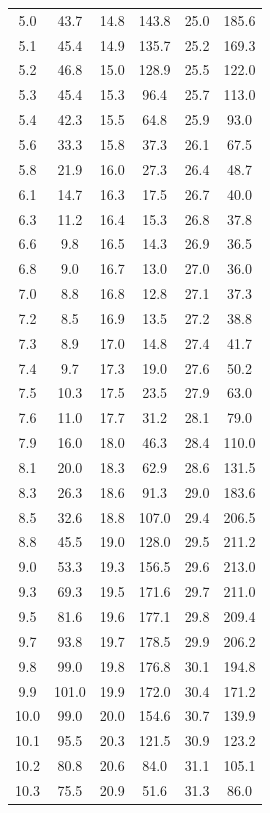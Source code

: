 \documentclass[a4paper,fontset=windows]{ctexart}
\begin{document}
\begin{center}
\begin{longtable}{ cccccc }
            5.0  & 43.7  & 14.8 & 143.8 & 25.0 & 185.6 \\
            5.1  & 45.4  & 14.9 & 135.7 & 25.2 & 169.3 \\
            5.2  & 46.8  & 15.0 & 128.9 & 25.5 & 122.0 \\
            5.3  & 45.4  & 15.3 & 96.4  & 25.7 & 113.0 \\
            5.4  & 42.3  & 15.5 & 64.8  & 25.9 & 93.0  \\
            5.6  & 33.3  & 15.8 & 37.3  & 26.1 & 67.5  \\
            5.8  & 21.9  & 16.0 & 27.3  & 26.4 & 48.7  \\
            6.1  & 14.7  & 16.3 & 17.5  & 26.7 & 40.0  \\
            6.3  & 11.2  & 16.4 & 15.3  & 26.8 & 37.8  \\
            6.6  &  9.8  & 16.5 & 14.3  & 26.9 & 36.5  \\
            6.8  &  9.0  & 16.7 & 13.0  & 27.0 & 36.0  \\
            7.0  &  8.8  & 16.8 & 12.8  & 27.1 & 37.3  \\
            7.2  &  8.5  & 16.9 & 13.5  & 27.2 & 38.8  \\
            7.3  &  8.9  & 17.0 & 14.8  & 27.4 & 41.7  \\
            7.4  &  9.7  & 17.3 & 19.0  & 27.6 & 50.2  \\
            7.5  & 10.3  & 17.5 & 23.5  & 27.9 & 63.0  \\
            7.6  & 11.0  & 17.7 & 31.2  & 28.1 & 79.0  \\
            7.9  & 16.0  & 18.0 & 46.3  & 28.4 & 110.0 \\
            8.1  & 20.0  & 18.3 & 62.9  & 28.6 & 131.5 \\
            8.3  & 26.3  & 18.6 & 91.3  & 29.0 & 183.6 \\
            8.5  & 32.6  & 18.8 & 107.0 & 29.4 & 206.5 \\
            8.8  & 45.5  & 19.0 & 128.0 & 29.5 & 211.2 \\
            9.0  & 53.3  & 19.3 & 156.5 & 29.6 & 213.0 \\
            9.3  & 69.3  & 19.5 & 171.6 & 29.7 & 211.0 \\
            9.5  & 81.6  & 19.6 & 177.1 & 29.8 & 209.4 \\
            9.7  & 93.8  & 19.7 & 178.5 & 29.9 & 206.2 \\
            9.8  & 99.0  & 19.8 & 176.8 & 30.1 & 194.8 \\
            9.9  & 101.0 & 19.9 & 172.0 & 30.4 & 171.2 \\
            10.0 & 99.0  & 20.0 & 154.6 & 30.7 & 139.9 \\
            10.1 & 95.5  & 20.3 & 121.5 & 30.9 & 123.2 \\
            10.2 & 80.8  & 20.6 & 84.0  & 31.1 & 105.1 \\
            10.3 & 75.5  & 20.9 & 51.6  & 31.3 & 86.0  \\
            \bottomrule[0.1em]
        \end{longtable}
    \end{center}
\end{document}
